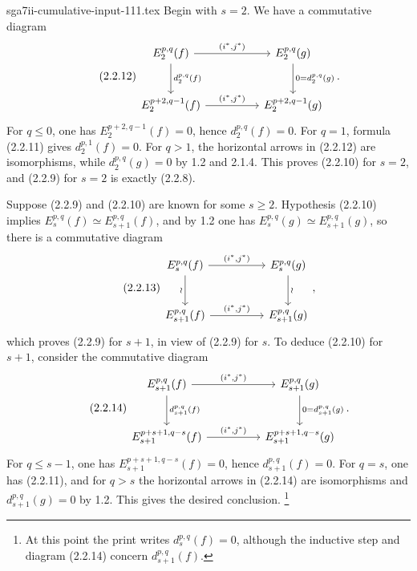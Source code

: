 \begin{filecontents*}{sga7ii-cumulative-input-111.tex}
Begin with $s=2$. We have a commutative diagram
\begin{equation}\tag{2.2.12}
\begin{tikzcd}[column sep=huge,row sep=large]
E_2^{p,q}(f)
  \arrow[r,"{(i^*,j^*)}"]
  \arrow[d,"{d_2^{p,q}(f)}"]
&
E_2^{p,q}(g)
  \arrow[d,"{0=d_2^{p,q}(g)}"]
\\
E_2^{p+2,q-1}(f)
  \arrow[r,"{(i^*,j^*)}"]
&
E_2^{p+2,q-1}(g)
\end{tikzcd}.
\end{equation}
For $q\leq0$, one has $E_2^{p+2,q-1}(f)=0$, hence
$d_2^{p,q}(f)=0$. For $q=1$, formula (2.2.11) gives
$d_2^{p,1}(f)=0$. For $q>1$, the horizontal arrows in (2.2.12) are
isomorphisms, while $d_2^{p,q}(g)=0$ by 1.2 and 2.1.4. This proves
(2.2.10) for $s=2$, and (2.2.9) for $s=2$ is exactly (2.2.8).

Suppose (2.2.9) and (2.2.10) are known for some $s\geq2$. Hypothesis
(2.2.10) implies
$E_s^{p,q}(f)\simeq E_{s+1}^{p,q}(f)$, and by 1.2 one has
$E_s^{p,q}(g)\simeq E_{s+1}^{p,q}(g)$, so there is a commutative diagram
\begin{equation}\tag{2.2.13}
\begin{tikzcd}[column sep=huge,row sep=large]
E_s^{p,q}(f)
  \arrow[r,"{(i^*,j^*)}"]
  \arrow[d,"\wr"']
&
E_s^{p,q}(g)
  \arrow[d,"\wr"]
\\
E_{s+1}^{p,q}(f)
  \arrow[r,"{(i^*,j^*)}"]
&
E_{s+1}^{p,q}(g)
\end{tikzcd},
\end{equation}
which proves (2.2.9) for $s+1$, in view of (2.2.9) for $s$. To deduce
(2.2.10) for $s+1$, consider the commutative diagram
\begin{equation}\tag{2.2.14}
\begin{tikzcd}[column sep=huge,row sep=large]
E_{s+1}^{p,q}(f)
  \arrow[r,"{(i^*,j^*)}"]
  \arrow[d,"{d_{s+1}^{p,q}(f)}"]
&
E_{s+1}^{p,q}(g)
  \arrow[d,"{0=d_{s+1}^{p,q}(g)}"]
\\
E_{s+1}^{p+s+1,q-s}(f)
  \arrow[r,"{(i^*,j^*)}"]
&
E_{s+1}^{p+s+1,q-s}(g)
\end{tikzcd}.
\end{equation}
For $q\leq s-1$, one has $E_{s+1}^{p+s+1,q-s}(f)=0$, hence
$d_{s+1}^{p,q}(f)=0$. For $q=s$, one has (2.2.11), and for $q>s$ the
horizontal arrows in (2.2.14) are isomorphisms and
$d_{s+1}^{p,q}(g)=0$ by 1.2. This gives the desired conclusion.
\footnote{At this point the print writes $d_s^{p,q}(f)=0$, although the
inductive step and diagram (2.2.14) concern $d_{s+1}^{p,q}(f)$.}


\end{filecontents*}
